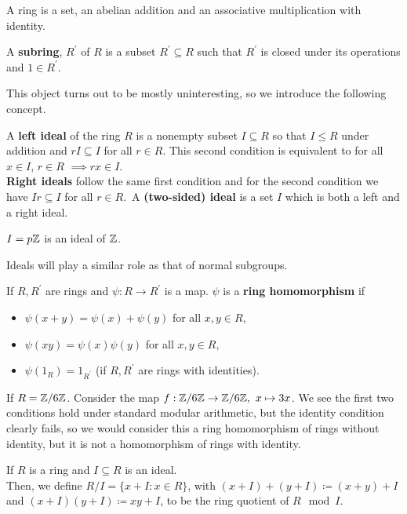 \begin{recall}
	A ring is a set, an abelian addition and an associative multiplication with identity.
\end{recall}
\begin{definition}[Subring]
	A \textbf{subring},  \(R^{\prime}\) of \(R\) is a subset \(R^{\prime} \subseteq R\) such that \(R^{\prime}\) is closed under its operations and \(1 \in R^{\prime}\).
\end{definition}
This object turns out to be mostly uninteresting, so we introduce the following concept.
\begin{definition}[Ideal]
	A \textbf{left ideal} of the ring \(R\) is a nonempty subset \(I \subseteq R\) so that \(I \le R\) under addition and \(rI \subseteq I\) for all \(r \in R\). This second condition is equivalent to for all \(x \in I\), \(r \in R	\)  \(\implies rx \in I\).\\
	\textbf{Right ideals} follow the same first condition and for the second condition we have \(Ir \subseteq I\) for all \(r \in R\).\
	A \textbf{(two-sided) ideal} is a set \(I\) which is both a left and a right ideal.
\end{definition}
\begin{example}
	\(I = p\mathbb{Z}\) is an ideal of \(\mathbb{Z}\).\\
\end{example}
Ideals will play a similar role as that of normal subgroups.
\begin{definition}
If \(R, R^{\prime}\) 	are rings and \(\psi: R \to R^{\prime}\) is a map. \(\psi\) is a \textbf{ring homomorphism} if
\begin{itemize}
	\item \(\psi\left( x + y \right) = \psi (x) + \psi (y) \) for all \(x, y \in R\),
	\item \(\psi\left( xy \right)  = \psi\left( x \right) \psi\left( y \right) \) for all \(x, y \in R\),
	\item \(\psi\left( 1_{R} \right) = 1_{R^{\prime}}\)  (if \(R, R^{\prime}\) are rings with identities).
\end{itemize}
\end{definition}
\begin{example}
	If \(R = \mathbb{Z} / 6\mathbb{Z}\). Consider the map \(f: \mathbb{Z} / 6\mathbb{Z} \to \mathbb{Z} / 6\mathbb{Z}, \ x \mapsto 3x\). We see the first two conditions hold under standard modular arithmetic, but the identity condition clearly fails, so we would consider this a ring homomorphism of rings without identity, but it is not a homomorphism of rings with identity.
\end{example}
\begin{definition}
	If \(R\) is a ring and \(I \subseteq R\) is an ideal. \\ Then, we define \(R / I = \{x + I : x \in R\} \), with \(\left( x + I \right)  + \left( y + I \right) \coloneqq \left( x + y \right) + I\) and \(\left( x + I \right) \left( y + I \right)  \coloneqq xy + I\),   to be the ring quotient of \(R \mod I\).
\end{definition}
